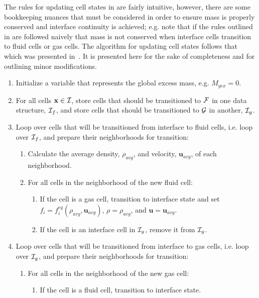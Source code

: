 \documentclass[pdftex,ms]{pittetd}
\newcommand{\pos}{\mathbf{x}}
\begin{document}
The rules for updating cell states in  are fairly intuitive, however, there are some bookkeeping nuances that must be considered in order to ensure mass is properly conserved and interface continuity is achieved; e.g. note that if the rules outlined in  are followed naively that mass is not conserved when interface cells transition to fluid cells or gas cells.
The algorithm for updating cell states follows that which was presented in~\citet{thurey2005interactive}.
It is presented here for the sake of completeness and for outlining minor modifications.
\begin{enumerate}
\item Initialize a variable that represents the global excess mass, e.g. $M_{gex} = 0$.
\item For all cells $\pos \in \iset$, store cells that should be transitioned to $\mathcal{F}$ in one data structure, $\mathcal{I}_f$, and store cells that should be transitioned to $\mathcal{G}$ in another, $\mathcal{I}_g$.
\item \label{enum:prep-fnbrs} Loop over cells that will be transitioned from interface to fluid cells, i.e. loop over $\mathcal{I}_f$, and prepare their neighborhoods for transition:
	\begin{enumerate}
	\item Calculate the average density, $\rho_{avg}$, and velocity, $\mathbf{u}_{avg}$, of each neighborhood.
	\item For all cells in the neighborhood of the new fluid cell:
		\begin{enumerate}
			\item If the cell is a gas cell, transition to interface state and set $f_i = f_i^{eq}(\rho_{avg}, \mathbf{u}_{avg})$, $\rho = \rho_{avg}$, and $\mathbf{u} = \mathbf{u}_{avg}$.
			\item If the cell is an interface cell in $\mathcal{I}_g$, remove it from $\mathcal{I}_g$.
		\end{enumerate}
	\end{enumerate}
\item \label{enum:prep-gnbrs} Loop over cells that will be transitioned from interface to gas cells, i.e. loop over $\mathcal{I}_g$, and prepare their neighborhoods for transition:
	\begin{enumerate}
	\item For all cells in the neighborhood of the new gas cell:
		\begin{enumerate}
			\item If the cell is a fluid cell, transition to interface state.

\end{enumerate}
\end{enumerate}
\end{enumerate}
\end{document}
